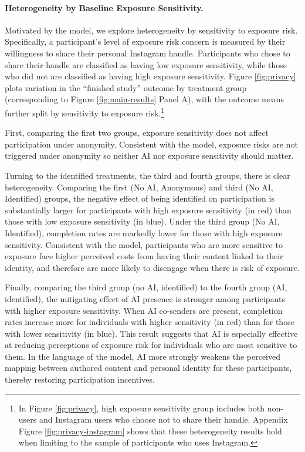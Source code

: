 \documentclass[12pt,notitlepage]{article}
\theoremstyle{plain}
\theoremstyle{plain}
\theoremstyle{definition}
\theoremstyle{definition}
\theoremstyle{assumption}
\theoremstyle{plain}
\theoremstyle{plain}
\theoremstyle{plain}
\theoremstyle{plain}
\theoremstyle{definition}%
\theoremstyle{plain}
\theoremstyle{plain}
\theoremstyle{plain}
\theoremstyle{plain}
\begin{document}
\paragraph{Heterogeneity by Baseline Exposure Sensitivity.} Motivated by the model, we explore heterogeneity by sensitivity to exposure risk. Specifically, a participant's level of exposure risk concern is measured by their willingness to share their personal Instagram handle. Participants who chose to share their handle are classified as having low exposure sensitivity, while those who did not are classified as having high exposure sensitivity.  Figure \ref{fig:privacy} plots variation in the ``finished study'' outcome by treatment group (corresponding to Figure \ref{fig:main-results} Panel A), with the outcome means further split by sensitivity to exposure risk.\footnote{In Figure \ref{fig:privacy}, high exposure sensitivity group includes both non-users and Instagram users who choose not to share their handle. Appendix Figure \ref{fig:privacy-instagram} shows that these heterogeneity results hold when limiting to the sample of participants who uses Instagram.}


First, comparing the first two groups, exposure sensitivity does not affect participation under anonymity. Consistent with the model, exposure risks are not triggered under anonymity so neither AI nor exposure sensitivity should matter.

Turning to the identified treatments, the third and fourth groups, there is clear heterogeneity. Comparing the first (No AI, Anonymous) and third (No AI, Identified) groups, the negative effect of being identified on participation is substantially larger for participants with high exposure sensitivity (in red) than those with low exposure sensitivity (in blue). Under the third group (No AI, Identified), completion rates are markedly lower for those with high exposure sensitivity. Consistent with the model, participants who are more sensitive to exposure face higher perceived costs from having their content linked to their identity, and therefore are more likely to disengage when there is risk of exposure. 


Finally, comparing the third group (no AI, identified) to the fourth group (AI, identified), the mitigating effect of AI presence is stronger among participants with higher exposure sensitivity. When AI co-senders are present, completion rates increase more for individuals with higher sensitivity (in red) than for those with lower sensitivity (in blue). This result suggests that AI is especially effective at reducing perceptions of exposure risk for individuals who are most sensitive to them. In the language of the model, AI more strongly weakens the perceived mapping between authored content and personal identity for these participants, thereby restoring participation incentives.
\end{document}

